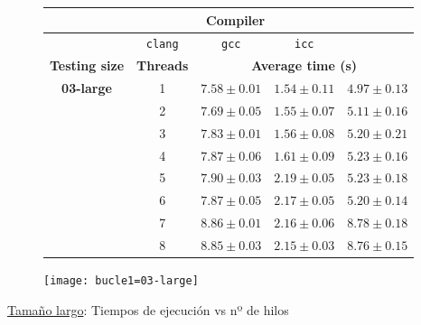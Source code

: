 \begin{figure}[H]
    \centering
    \begin{subfigure}{0.4\textwidth}
        \begin{adjustbox}{width=\textwidth} 
        \begin{tabular}{|c|c|c|c|c|}
            \hline
            \rowcolor{azul} \multicolumn{2}{|c|}{}&\multicolumn{3}{c|}{\textbf{Compiler}} \\ \hline
            \rowcolor{azul} \multicolumn{2}{|c|}{}&\texttt{clang}&\texttt{gcc}&\texttt{icc}\\ \hline
            \rowcolor{azul} \textbf{Testing size} & \textbf{Threads}&\multicolumn{3}{c|}{\textbf{Average time (s)}} \\ \hline
            \multirow{8}{1cm}{\textbf{03-large}} & 1 & \(7.58\pm{0.01}\) & \(1.54\pm{0.11}\) & \(4.97\pm{0.13}\) \\ \cline{2-5}
            & 2 & \(7.69\pm{0.05}\) & \(1.55\pm{0.07}\) & \(5.11\pm{0.16}\) \\ \cline{2-5}
            & 3 & \(7.83\pm{0.01}\) & \(1.56\pm{0.08}\) & \(5.20\pm{0.21}\) \\ \cline{2-5}
            & 4 & \(7.87\pm{0.06}\) & \(1.61\pm{0.09}\) & \(5.23\pm{0.16}\) \\ \cline{2-5}
            & 5 & \(7.90\pm{0.03}\) & \(2.19\pm{0.05}\) & \(5.23\pm{0.18}\) \\ \cline{2-5}
            & 6 & \(7.87\pm{0.05}\) & \(2.17\pm{0.05}\) & \(5.20\pm{0.14}\) \\ \cline{2-5}
            & 7 & \(8.86\pm{0.01}\) & \(2.16\pm{0.06}\) & \(8.78\pm{0.18}\) \\ \cline{2-5}
            & 8 & \(8.85\pm{0.03}\) & \(2.15\pm{0.03}\) & \(8.76\pm{0.15}\) \\ \hline
        \end{tabular}
        \end{adjustbox}
    \end{subfigure}
    \hfill
    \begin{subfigure}{0.5\textwidth}
        \texttt{[image: bucle1=03-large]}
    \end{subfigure}
    \caption{\underline{Tamaño largo}: Tiempos de ejecución vs nº de hilos}
    \label{bucle1=03-large}
\end{figure}
